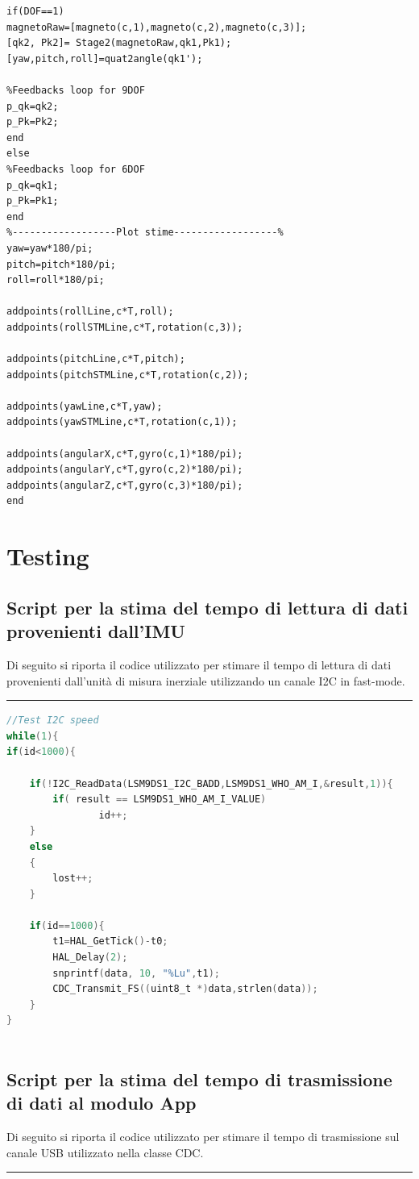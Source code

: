 \begin{lstlisting}[style=Matlab-editor]
%----------Stage 2:correction positio--------%
if(DOF==1)
magnetoRaw=[magneto(c,1),magneto(c,2),magneto(c,3)];
[qk2, Pk2]= Stage2(magnetoRaw,qk1,Pk1);
[yaw,pitch,roll]=quat2angle(qk1');

%Feedbacks loop for 9DOF
p_qk=qk2;
p_Pk=Pk2;
end
else
%Feedbacks loop for 6DOF
p_qk=qk1;
p_Pk=Pk1;
end
%------------------Plot stime------------------%
yaw=yaw*180/pi;
pitch=pitch*180/pi;
roll=roll*180/pi;

addpoints(rollLine,c*T,roll);
addpoints(rollSTMLine,c*T,rotation(c,3));

addpoints(pitchLine,c*T,pitch);
addpoints(pitchSTMLine,c*T,rotation(c,2));

addpoints(yawLine,c*T,yaw);
addpoints(yawSTMLine,c*T,rotation(c,1));

addpoints(angularX,c*T,gyro(c,1)*180/pi);
addpoints(angularY,c*T,gyro(c,2)*180/pi);
addpoints(angularZ,c*T,gyro(c,3)*180/pi);
end
\end{lstlisting}



\section{Testing}
\subsection{Script per la stima del tempo di lettura di dati provenienti dall'IMU }
\label{app:stimai2c}
Di seguito si riporta il codice utilizzato per stimare il tempo di lettura di dati provenienti dall'unità di misura inerziale utilizzando un canale I2C in fast-mode.\\
\noindent\rule{14.1cm}{0.4pt}
\begin{lstlisting}[language=C]
//Test I2C speed
while(1){
if(id<1000){

	if(!I2C_ReadData(LSM9DS1_I2C_BADD,LSM9DS1_WHO_AM_I,&result,1)){
		if( result == LSM9DS1_WHO_AM_I_VALUE)
				id++;
	}
	else
	{
		lost++;
	}
	
 	if(id==1000){
		t1=HAL_GetTick()-t0;
		HAL_Delay(2);
		snprintf(data, 10, "%Lu",t1);
		CDC_Transmit_FS((uint8_t *)data,strlen(data));
	}
}



\end{lstlisting}







\subsection{Script per la stima del tempo di trasmissione di dati al modulo App}
\label{app:stimausb}
Di seguito si riporta il codice utilizzato per stimare il tempo di trasmissione sul canale USB utilizzato nella classe CDC.\\
\noindent\rule{14.1cm}{0.4pt}

